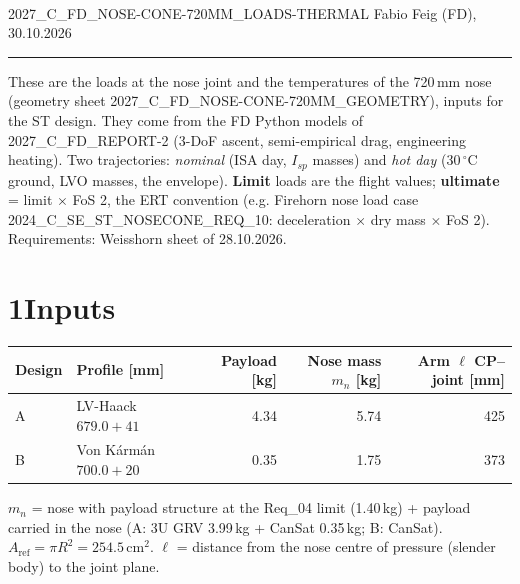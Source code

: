 \documentclass[10pt,a4paper]{article}
\begin{document}
\\[2pt]
2027\_C\_FD\_NOSE-CONE-720MM\_LOADS-THERMAL \hfill Fabio Feig (FD), 30.10.2026
\par\medskip\hrule\medskip

These are the loads at the nose joint and the temperatures of the 720\,mm nose (geometry sheet
2027\_C\_FD\_NOSE-CONE-720MM\_GEOMETRY), inputs for the ST design. They come from the FD Python
models of 2027\_C\_FD\_REPORT-2 (3-DoF ascent, semi-empirical drag, engineering heating). Two
trajectories: \emph{nominal} (ISA day, $I_{sp}$ masses) and \emph{hot day} (30\,$^\circ$C ground,
LVO masses, the envelope). \textbf{Limit} loads are the flight values; \textbf{ultimate} = limit
$\times$ FoS 2, the ERT convention (e.g. Firehorn nose load case 2024\_C\_SE\_ST\_NOSECONE\_REQ\_10:
deceleration $\times$ dry mass $\times$ FoS 2). Requirements: Weisshorn sheet of 28.10.2026.

\section*{1\quad Inputs}
\begin{center}\small
\begin{tabular}{@{}llrrr@{}}
\toprule
Design & Profile [mm] & Payload [kg] & Nose mass $m_n$ [kg] & Arm $\ell$ CP--joint [mm]\\
\midrule
A & LV-Haack $679.0 + 41$ & 4.34 & 5.74 & 425 \\
B & Von K\'arm\'an $700.0 + 20$ & 0.35 & 1.75 & 373 \\
\bottomrule
\end{tabular}
\end{center}
$m_n$ = nose with payload structure at the Req\_04 limit (1.40\,kg) + payload carried in the nose (A:
3U GRV 3.99\,kg + CanSat 0.35\,kg; B: CanSat). $A_\mathrm{ref} = \pi R^2 = 254.5$\,cm$^2$.
$\ell$ = distance from the nose centre of pressure (slender body) to the joint plane.
\end{document}
